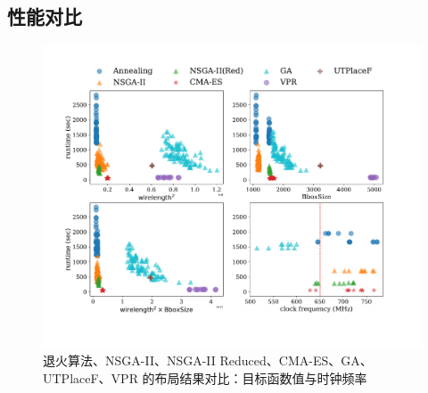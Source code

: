 \subsection{性能对比}

\begin{figure}[h]
	\centering
	\includegraphics[width=\textwidth]{figure/objective-runtime}
	\caption{退火算法、NSGA-II、NSGA-II Reduced、CMA-ES、GA、UTPlaceF、VPR 的布局结果对比：目标函数值与时钟频率} 
	\label{fig:objective}
\end{figure}


